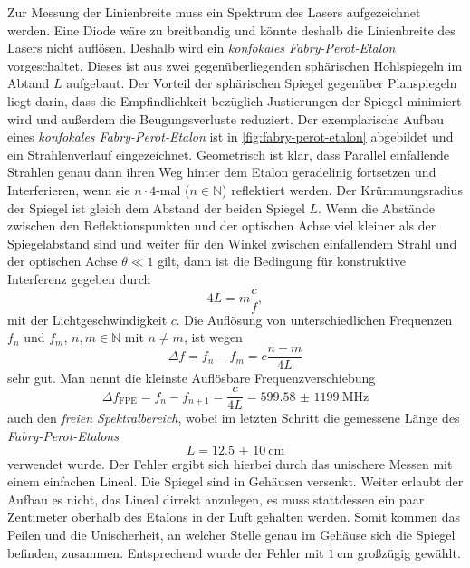 \documentclass[../bericht.tex]{subfiles}
\begin{document}
        Zur Messung der Linienbreite muss ein Spektrum des Lasers aufgezeichnet werden. Eine Diode w\"are zu breitbandig und k\"onnte deshalb die Linienbreite des Lasers nicht aufl\"osen. Deshalb wird ein \textit{konfokales Fabry-Perot-Etalon} vorgeschaltet. Dieses ist aus zwei gegen\"uberliegenden sph\"arischen Hohlspiegeln im Abtand $L$ aufgebaut. Der Vorteil der sph\"arischen Spiegel gegen\"uber Planspiegeln liegt darin, dass die Empfindlichkeit bez\"uglich Justierungen der Spiegel minimiert wird und au\ss{}erdem die Beugungsverluste reduziert. Der exemplarische Aufbau eines \textit{konfokales Fabry-Perot-Etalon} ist in \cref{fig:fabry-perot-etalon} abgebildet und ein Strahlenverlauf eingezeichnet. Geometrisch ist klar, dass Parallel einfallende Strahlen genau dann ihren Weg hinter dem Etalon geradelinig fortsetzen und Interferieren, wenn sie $n\cdot 4$-mal ($n\in\mathbb{N}$) reflektiert werden. Der Kr\"ummungsradius der Spiegel ist gleich dem Abstand der beiden Spiegel $L$. Wenn die Abst\"ande zwischen den Reflektionspunkten und der optischen Achse viel kleiner als der Spiegelabstand sind und weiter f\"ur den Winkel zwischen einfallendem Strahl und der optischen Achse $\theta \ll 1$ gilt, dann ist die Bedingung f\"ur konstruktive Interferenz gegeben durch
        \begin{equation*}
          4L = m \frac{c}{f},
        \end{equation*}
        mit der Lichtgeschwindigkeit $c$. Die Aufl\"osung von unterschiedlichen Frequenzen $f_n$ und $f_m$, $n,m\in\mathbb{N}$ mit $n\ne m $, ist wegen
        \begin{equation*}
          \Delta f= f_n -f_m =c \frac{n-m}{4L}
        \end{equation*}
        sehr gut. Man nennt die kleinste Aufl\"osbare Frequenzverschiebung
        \begin{equation}
          \Delta f_\mathrm{FPE} = f_n - f_{n+1} = \frac{c}{4L} = \SI{599,58(1199)}{\mega\hertz}
          \label{eq:freier-spektralbereich}
        \end{equation}
        auch den \textit{freien Spektralbereich}, wobei im letzten Schritt die gemessene L\"ange des \textit{Fabry-Perot-Etalons}
        \begin{equation*}
          L=\SI{12,5(10)}{\centi\meter}
        \end{equation*}
        verwendet wurde. Der Fehler ergibt sich hierbei durch das unischere Messen mit einem einfachen Lineal. Die Spiegel sind in Geh\"ausen versenkt. Weiter erlaubt der Aufbau es nicht, das Lineal dirrekt anzulegen, es muss stattdessen ein paar Zentimeter oberhalb des Etalons in der Luft gehalten werden. Somit kommen das Peilen und die Unischerheit, an welcher Stelle genau im Geh\"ause sich die Spiegel befinden, zusammen. Entsprechend wurde der Fehler mit $\SI{1}{\centi\meter}$ gro\ss{}z\"ugig gew\"ahlt.
\end{document}
